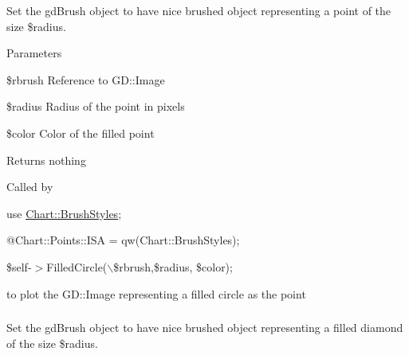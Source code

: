 Set the gdBrush object to have nice brushed object representing a point of the size \$radius. 


\begin{DoxyParams}{Parameters}
\item[\mbox{\tt[in]} {\em $\ast$GD::Image}]\$rbrush Reference to GD::Image \item[\mbox{\tt[in]} {\em int}]\$radius Radius of the point in pixels \item[\mbox{\tt[in]} {\em int}]\$color Color of the filled point \end{DoxyParams}
\begin{DoxyReturn}{Returns}
nothing
\end{DoxyReturn}
Called by\par
 use \hyperlink{classChart_1_1BrushStyles}{Chart::BrushStyles};\par
 @Chart::Points::ISA = qw(Chart::BrushStyles);\par
 \$self-\/$>$FilledCircle($\backslash$\$rbrush,\$radius, \$color);\par
 to plot the GD::Image representing a filled circle as the point \hypertarget{classChart_1_1BrushStyles_a2c807213b768f1a0941cbd7aebee7642}{
\subsubsection[{FilledDiamond}]{}}
\label{classChart_1_1BrushStyles_a2c807213b768f1a0941cbd7aebee7642}


Set the gdBrush object to have nice brushed object representing a filled diamond of the size \$radius. 


